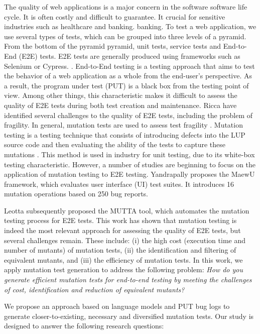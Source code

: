 \label{sec:introduction}

The quality of web applications is a major concern in the software software life
cycle. It is often costly and difficult to guarantee. It crucial for sensitive
industries such as healthcare and banking. banking. To test a web application,
we use several types of tests, which can be grouped into three levels of a
pyramid. From the bottom of the pyramid pyramid, unit tests, service tests and
End-to-End (E2E) tests. E2E tests are generally produced using frameworks such as Selenium or Cypress.
\cite{cerioli20205}. End-to-End testing is a testing approach that aims to
test the behavior of a web application as a whole from the end-user's
perspective. As a result, the program under test (PUT) is a black box from the
testing point of view. Among other things, this characteristic makes it
difficult to assess the quality of E2E tests during both test creation and
maintenance. Ricca \etal \cite{ricca2019three} have identified several challenges to
the quality of E2E tests, including the problem of fragility. In general,
mutation tests are used to assess test fragility \cite{hamimoune2016mutation}. Mutation testing is a testing technique that consists of introducing defects
into the LUP source code and then evaluating the ability of the tests to capture
these mutations \cite{woodward1993mutation}. This method is used in industry for unit testing, due to its white-box testing
characteristic. However, a number of studies are beginning to focus on the
application of mutation testing to E2E testing. Yandrapally \etal \cite{yandrapally2021mutation} proposes the MaewU framework, which evaluates
user interface (UI) test suites. It introduces 16 mutation operations based on
250 bug reports.


Leotta \etal \cite{leotta2024mutta} subsequently proposed the MUTTA tool, which automates the mutation testing process for E2E tests. This work has shown that mutation testing is indeed the most relevant approach for assessing the quality of E2E tests, but several challenges remain. These include: (i) the high cost (execution time and number of mutants) of mutation tests, (ii) the identification and filtering of equivalent mutants, and (iii) the efficiency of mutation tests. In this work, we apply mutation test generation to address the following problem:
\textit{How do you generate efficient mutation tests for end-to-end testing by meeting the challenges of cost, identification and reduction of equivalent mutants?}

We propose an approach based on language models and PUT bug logs to generate closer-to-existing, necessary and diversified mutation tests. Our study is designed to answer the following research questions:

